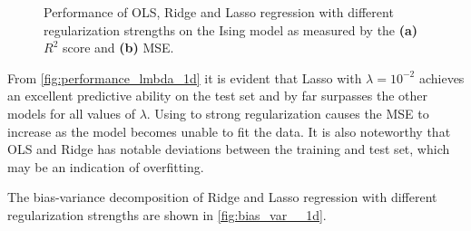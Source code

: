 \begin{figure}[H]
\centering
{}
\qquad
{}
\caption{Performance of OLS, Ridge and Lasso regression with different regularization strengths on the Ising model as measured by the \textbf{(a)} $R^2$ score and \textbf{(b)} MSE.}
\label{fig:performance_lmbda_1d}
\end{figure}

From \autoref{fig:performance_lmbda_1d} it is evident that Lasso with $\lambda=10^{-2}$ achieves an excellent predictive ability on the test set and by far surpasses the other models for all values of $\lambda$. Using to strong regularization causes the MSE to increase as the model becomes unable to fit the data. It is also noteworthy that OLS and Ridge has notable deviations between the training and test set, which may be an indication of overfitting.

The bias-variance decomposition of Ridge and Lasso regression with different regularization strengths are shown in \autoref{fig:bias_var__1d}.

